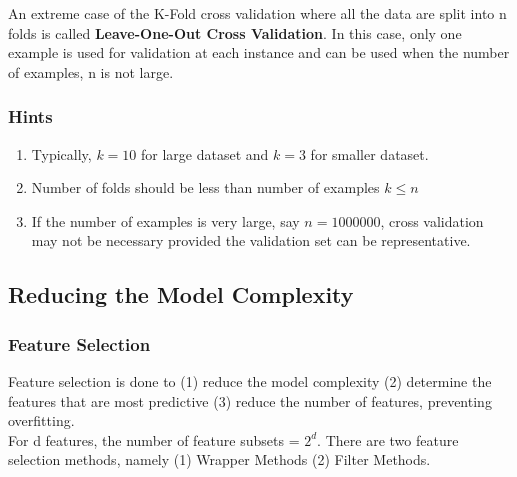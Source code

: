 \documentclass[12pt,a4paper,titlepage,landscape]{book}
\begin{document}
	An extreme case of the K-Fold cross validation where all the data are split into n folds is called \textbf{Leave-One-Out Cross Validation}. In this case, only one example is used for validation at each instance and can be used when the number of examples, n is not large.\\
	
	\subsubsection{Hints}
	\begin{enumerate}
		\item Typically, $k = 10$ for large dataset and $k = 3$ for smaller dataset.
		\item Number of folds should be less than number of examples $k \leq n$
		\item If the number of examples is very large, say $n  = 1000000$, cross validation may not be necessary provided the validation set can be representative.
		
	\end{enumerate}
	
	\subsection{Reducing the Model Complexity}
	\subsubsection{Feature Selection}
	Feature selection is done to (1) reduce the model complexity (2) determine the features that are most predictive (3) reduce the number of features, preventing overfitting. \\
	For d features, the number of feature subsets = $2^d$.
	There are two feature selection methods, namely (1) Wrapper Methods (2) Filter Methods. \\
	\\
\end{document}
